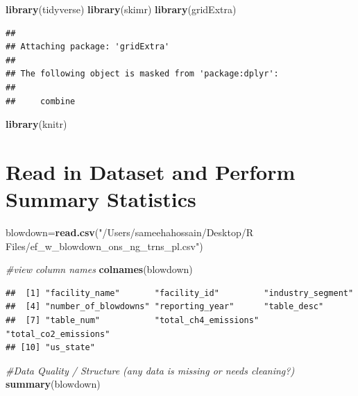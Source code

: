 \documentclass[
]{article}
\newenvironment{Shaded}{\begin{snugshade}}{\end{snugshade}}
\newcommand{\CommentTok}[1]{\textcolor[rgb]{0.56,0.35,0.01}{\textit{#1}}}
\newcommand{\FunctionTok}[1]{\textcolor[rgb]{0.13,0.29,0.53}{\textbf{#1}}}
\newcommand{\NormalTok}[1]{#1}
\newcommand{\OtherTok}[1]{\textcolor[rgb]{0.56,0.35,0.01}{#1}}
\newcommand{\StringTok}[1]{\textcolor[rgb]{0.31,0.60,0.02}{#1}}
\begin{document}
\begin{Shaded}
\begin{Highlighting}[]
\FunctionTok{library}\NormalTok{(tidyverse)}
\FunctionTok{library}\NormalTok{(skimr)}
\FunctionTok{library}\NormalTok{(gridExtra)}
\end{Highlighting}
\end{Shaded}

\begin{verbatim}
## 
## Attaching package: 'gridExtra'
## 
## The following object is masked from 'package:dplyr':
## 
##     combine
\end{verbatim}

\begin{Shaded}
\begin{Highlighting}[]
\FunctionTok{library}\NormalTok{(knitr)}
\end{Highlighting}
\end{Shaded}

\section{Read in Dataset and Perform Summary
Statistics}\label{read-in-dataset-and-perform-summary-statistics}

\begin{Shaded}
\begin{Highlighting}[]
\NormalTok{blowdown}\OtherTok{=}\FunctionTok{read.csv}\NormalTok{(}\StringTok{"/Users/sameehahossain/Desktop/R Files/ef\_w\_blowdown\_ons\_ng\_trns\_pl.csv"}\NormalTok{)}

\CommentTok{\#view column names}
\FunctionTok{colnames}\NormalTok{(blowdown)}
\end{Highlighting}
\end{Shaded}

\begin{verbatim}
##  [1] "facility_name"       "facility_id"         "industry_segment"   
##  [4] "number_of_blowdowns" "reporting_year"      "table_desc"         
##  [7] "table_num"           "total_ch4_emissions" "total_co2_emissions"
## [10] "us_state"
\end{verbatim}

\begin{Shaded}
\begin{Highlighting}[]
\CommentTok{\#Data Quality / Structure (any data is missing or needs cleaning?)}
\FunctionTok{summary}\NormalTok{(blowdown)}
\end{Highlighting}
\end{Shaded}
\end{document}
